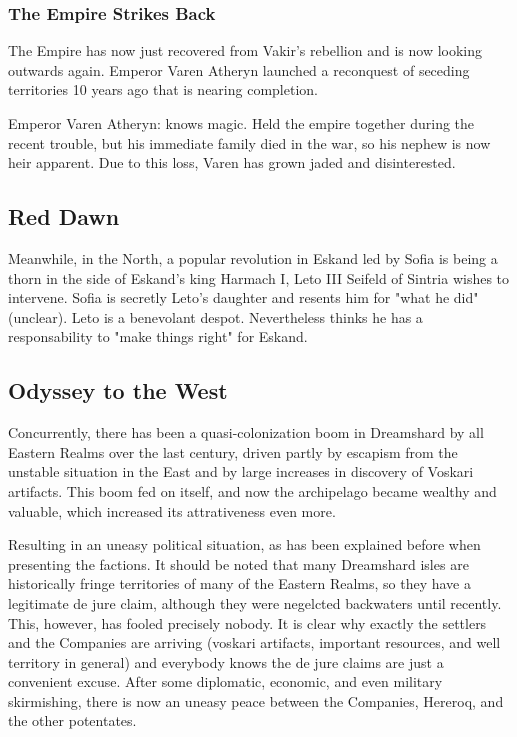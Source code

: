 \subsubsection{The Empire Strikes Back}

The Empire has now just recovered from Vakir's rebellion and is now looking outwards again. Emperor Varen Atheryn launched a reconquest of seceding territories 10 years ago that is nearing completion.


Emperor Varen Atheryn: knows magic. Held the empire together during the recent trouble, but his immediate family died in the war, so his nephew is now heir apparent. Due to this loss, Varen has grown jaded and disinterested.

\subsection{Red Dawn}

Meanwhile, in the North, a popular revolution in Eskand led by Sofia is being a thorn in the side of Eskand's king Harmach I, Leto III Seifeld of Sintria wishes to intervene. Sofia is secretly Leto's daughter and resents him for "what he did" (unclear). Leto is a benevolant despot. Nevertheless thinks he has a responsability to "make things right" for Eskand.

\subsection{Odyssey to the West}
 
Concurrently, there has been a quasi-colonization boom in Dreamshard by all Eastern Realms over the last century, driven partly by escapism from the unstable situation in the East and by large increases in discovery of Voskari artifacts. This boom fed on itself, and now the archipelago became wealthy and valuable, which increased its attrativeness even more.

Resulting in an uneasy political situation, as has been explained before when presenting the factions. It should be noted that many Dreamshard isles are historically fringe territories of many of the Eastern Realms, so they have a legitimate de jure claim, although they were negelcted backwaters until recently. This, however, has fooled precisely nobody. It is clear why exactly the settlers and the Companies are arriving (voskari artifacts, important resources, and well territory in general) and everybody knows the de jure claims are just a convenient excuse. After some diplomatic, economic, and even military skirmishing, there is now an uneasy peace between the Companies, Hereroq, and the other potentates.

